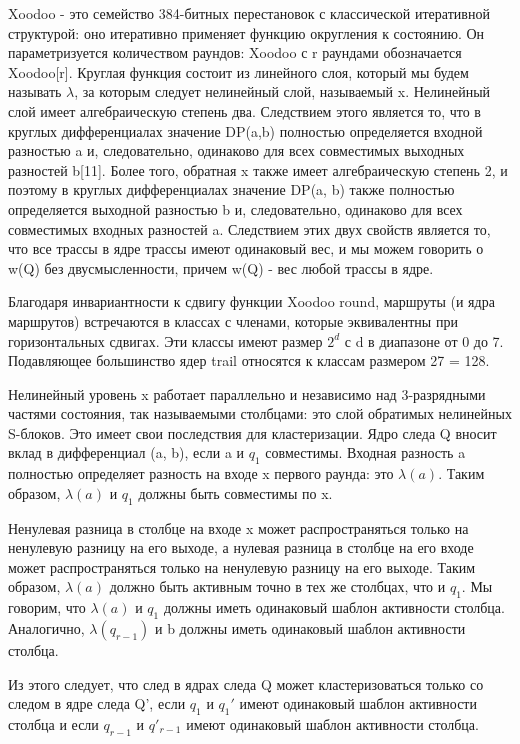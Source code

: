 \documentclass[utf8,14pt,a4paper,oneside,russian]{book}
\begin{document}
Xoodoo - это семейство 384-битных перестановок с классической итеративной 
структурой: оно итеративно применяет функцию округления к состоянию. 
Он параметризуется количеством раундов: Xoodoo с r раундами обозначается 
Xoodoo[r]. Круглая функция состоит из линейного слоя, который мы будем 
называть $\lambda$, за которым следует нелинейный слой, называемый x. 
Нелинейный слой имеет алгебраическую степень два. Следствием этого 
является то, что в круглых дифференциалах значение DP(a,b) полностью 
определяется входной разностью a и, следовательно, одинаково для всех 
совместимых выходных разностей b[11]. Более того, обратная x также имеет 
алгебраическую степень 2, и поэтому в круглых дифференциалах значение 
DP(a, b) также полностью определяется выходной разностью b и, следовательно, 
одинаково для всех совместимых входных разностей a. Следствием этих двух 
свойств является то, что все трассы в ядре трассы имеют одинаковый вес, 
и мы можем говорить о w(Q) без двусмысленности, причем w(Q) - вес любой 
трассы в ядре.

Благодаря инвариантности к сдвигу функции Xoodoo round, маршруты 
(и ядра маршрутов) встречаются в классах с членами, которые эквивалентны 
при горизонтальных сдвигах. Эти классы имеют размер $2^d$ с d в диапазоне 
от 0 до 7. Подавляющее большинство ядер trail относятся к классам 
размером 27 = 128.

Нелинейный уровень x работает параллельно и независимо над 3-разрядными 
частями состояния, так называемыми столбцами: это слой обратимых нелинейных 
S-блоков. Это имеет свои последствия для кластеризации. Ядро следа Q вносит 
вклад в дифференциал (a, b), если a и $q_1$ совместимы. Входная разность 
a полностью определяет разность на входе x первого раунда: это $\lambda(a)$. 
Таким образом, $\lambda(a)$ и $q_1$ должны быть совместимы по x.

Ненулевая разница в столбце на входе x может распространяться только на 
ненулевую разницу на его выходе, а нулевая разница в столбце на его входе 
может распространяться только на ненулевую разницу на его выходе. Таким 
образом, $\lambda(a)$ должно быть активным точно в тех же столбцах, что 
и $q_1$. Мы говорим, что $\lambda(a)$ и $q_1$ должны иметь одинаковый 
шаблон активности столбца. Аналогично, $\lambda(q_{r-1})$ и b должны 
иметь одинаковый шаблон активности столбца.

Из этого следует, что след в ядрах следа Q может кластеризоваться 
только со следом в ядре следа Q', если $q_1$ и $q_1'$ имеют одинаковый 
шаблон активности столбца и если $q_{r-1}$ и $q'_{r-1}$ имеют одинаковый 
шаблон активности столбца.
\end{document}
